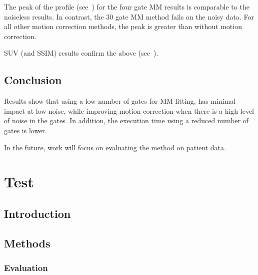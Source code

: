             The peak of the profile (see~) for the four gate \gls{MM} results is comparable to the noiseless results. In contrast, the $30$ gate \gls{MM} method fails on the noisy data. For all other motion correction methods, the peak is greater than without motion correction.
             
            \gls{SUV} (and \gls{SSIM}) results confirm the above (see~).

        \subsection{Conclusion} \label{sec:pet_ct_motion_correction_exploiting_motion_models_fit_on_coarsely_gated_data_applied_to_finely_gated_data_conclusion}
            Results show that using a low number of gates for \gls{MM} fitting, has minimal impact at low noise, while improving motion correction when there is a high level of noise in the gates. In addition, the execution time using a reduced number of gates is lower.
            
            In the future, work will focus on evaluating the method on patient data.

    \section{Test} \label{sec:test}


        \subsection{Introduction} \label{sec:test_introduction}
            
        
        \subsection{Methods} \label{sec:test_methods}
            
            
            \subsubsection{Evaluation} \label{sec:test_methods_evaluation}
                
        
